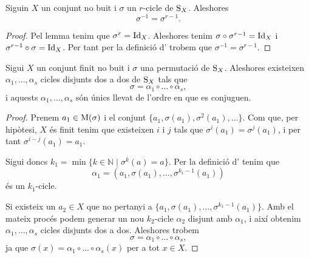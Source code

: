 \documentclass[../Apunts.tex]{subfiles}
\begin{document}
	\begin{theorem}
		\label{thm:inversa d'un r-cicle}
		Siguin \(X\) un conjunt no buit i \(\sigma\) un \(r\)-cicle de \(\operatorname{S}_{X}\). Aleshores
		\[\sigma^{-1}=\sigma^{r-1}.\]
		\begin{proof}
			Pel lemma  tenim que \(\sigma^{r}=\operatorname{Id}_{X}\). Aleshores tenim \(\sigma\circ\sigma^{r-1}=\operatorname{Id}_{X}\) i \(\sigma^{r-1}\circ\sigma=\operatorname{Id}_{X}\). Per tant per la definició d' trobem que \(\sigma^{-1}=\sigma^{r-1}\).
		\end{proof}
	\end{theorem}
	\begin{theorem}
		\label{thm:descomposició d'una permutació en cicles disjunts}
		Sigui \(X\) un conjunt finit no buit i \(\sigma\) una permutació de \(\operatorname{S}_{X}\). Aleshores existeixen \(\alpha_{1},\dots,\alpha_{s}\) cicles disjunts dos a dos de \(\operatorname{S}_{X}\) tals que
		\[\sigma=\alpha_{1}\circ\dots\circ\alpha_{s},\]
		i aquests \(\alpha_{1},\dots,\alpha_{s}\) són únics llevat de l'ordre en que es conjuguen.
		\begin{proof}
			Prenem \(a_{1}\in\operatorname{M}(\sigma)\) i el conjunt \(\{a_{1},\sigma(a_{1}),\sigma^{2}(a_{1}),\dots\}\). Com que, per hipòtesi, \(X\) és finit tenim que existeixen \(i\) i \(j\) tals que \(\sigma^{i}(a_{1})=\sigma^{j}(a_{1})\), i per tant \(\sigma^{i-j}(a_{1})=a_{1}\).
			
			Sigui doncs \(k_{1}=\min\{k\in\mathbb{N}\mid\sigma^{k}(a)=a\}\). Per la definició d' tenim que 
			\begin{equation}
			\label{eq:thm:descomposició de permutacions en cicles disjunts 2}
			\alpha_{1}=(a_{1},\sigma(a_{1}),\dots,\sigma^{k_{1}-1}(a_{1}))
			\end{equation}
			és un \(k_{1}\)-cicle.
			
			Si existeix un \(a_{2}\in X\) que no pertanyi a \(\{a_{1},\sigma(a_{1}),\dots,\sigma^{k_{1}-1}(a_{1})\}\). Amb el mateix procés podem generar un nou \(k_{2}\)-cicle \(\alpha_{2}\) disjunt amb \(\alpha_{1}\), i així obtenim \(\alpha_{1},\dots,\alpha_{s}\) cicles disjunts dos a dos. Aleshores trobem
			\[\sigma=\alpha_{1}\circ\dots\circ\alpha_{s},\]
			ja que \(\sigma(x)=\alpha_{1}\circ\dots\circ\alpha_{s}(x)\) per a tot \(x\in X\).
			

\end{proof}
\end{theorem}
\end{document}

